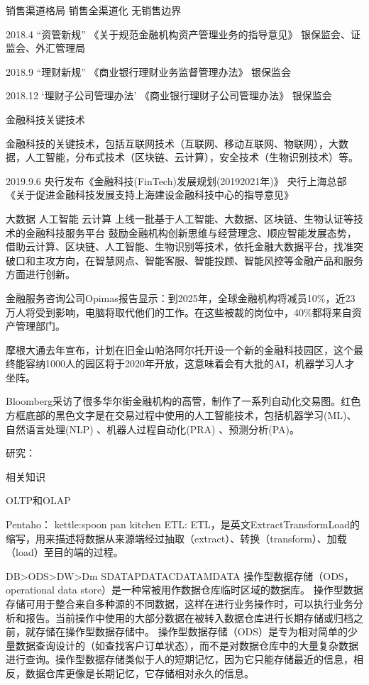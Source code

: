 \documentclass[letterpaper,12pt,english]{sphinxmanual}
\begin{document}
销售渠道格局 销售全渠道化 无销售边界

2018.4 “资管新规”
《关于规范金融机构资产管理业务的指导意见》
银保监会、证监会、外汇管理局

2018.9 “理财新规”
《商业银行理财业务监督管理办法》
银保监会

2018.12 ‘理财子公司管理办法’
《商业银行理财子公司管理办法》
银保监会

金融科技关键技术

金融科技的关键技术，包括互联网技术（互联网、移动互联网、物联网），大数据，人工智能，分布式技术（区块链、云计算），安全技术（生物识别技术）等。

2019.9.6 央行发布《金融科技(FinTech)发展规划(2019\sphinxhyphen{}2021年)》
央行上海总部《关于促进金融科技发展支持上海建设金融科技中心的指导意见》

大数据
人工智能
云计算
上线一批基于人工智能、大数据、区块链、生物认证等技术的金融科技服务平台
鼓励金融机构创新思维与经营理念、顺应智能发展态势，借助云计算、区块链、人工智能、生物识别等技术，依托金融大数据平台，找准突破口和主攻方向，在智慧网点、智能客服、智能投顾、智能风控等金融产品和服务方面进行创新。

金融服务咨询公司Opimas报告显示：到2025年，全球金融机构将减员10\%，近23万人将受到影响，电脑将取代他们的工作。在这些被裁的岗位中，40\%都将来自资产管理部门。

摩根大通去年宣布，计划在旧金山帕洛阿尔托开设一个新的金融科技园区，这个最终能容纳1000人的园区将于2020年开放，这意味着会有大批的AI，机器学习人才坐阵。

Bloomberg采访了很多华尔街金融机构的高管，制作了一系列自动化交易图。红色方框底部的黑色文字是在交易过程中使用的人工智能技术，包括机器学习(ML)、自然语言处理(NLP) 、机器人过程自动化(PRA) 、预测分析(PA)。

研究：

相关知识

OLTP和OLAP

Pentaho：
kettle:spoon pan kitchen
ETL:
ETL，是英文Extract\sphinxhyphen{}Transform\sphinxhyphen{}Load的缩写，用来描述将数据从来源端经过抽取（extract）、转换（transform）、加载（load）至目的端的过程。

DB\sphinxhyphen{}>ODS\sphinxhyphen{}>DW\sphinxhyphen{}>Dm
SDATA\sphinxhyphen{}PDATA\sphinxhyphen{}CDATA\sphinxhyphen{}MDATA
操作型数据存储（ODS，operational data store）是一种常被用作数据仓库临时区域的数据库。
操作型数据存储可用于整合来自多种源的不同数据，这样在进行业务操作时，可以执行业务分析和报告。当前操作中使用的大部分数据在被转入数据仓库进行长期存储或归档之前，就存储在操作型数据存储中。
操作型数据存储（ODS）是专为相对简单的少量数据查询设计的（如查找客户订单状态），而不是对数据仓库中的大量复杂数据进行查询。操作型数据存储类似于人的短期记忆，因为它只能存储最近的信息，相反，数据仓库更像是长期记忆，它存储相对永久的信息。
\end{document}
